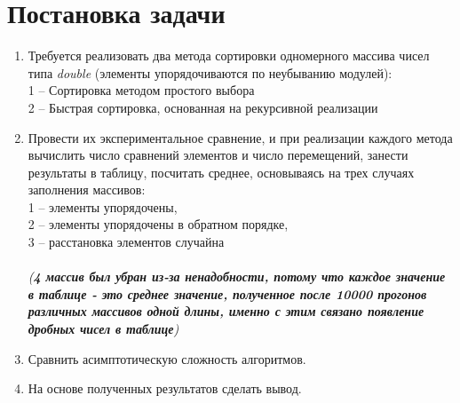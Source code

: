 \documentclass[a4paper,11pt]{article}
\begin{document}
    \newpage
    \section{Постановка задачи}
    \vspace{0,5cm}
    

    \begin{enumerate}
        \item Требуется реализовать два метода сортировки одномерного массива чисел типа \textit{double} (элементы упорядочиваются по неубыванию модулей):\\
        \hspace*{1 cm} 1 -- Сортировка методом простого выбора \\
        \hspace*{1 cm} 2 -- Быстрая сортировка, основанная на рекурсивной реализации
        \item Провести их экспериментальное сравнение, и при реализации каждого метода вычислить число сравнений элементов и число перемещений, занести результаты в таблицу, посчитать среднее, основываясь на трех случаях заполнения массивов:\\
        \hspace*{1.2 cm} 1 -- элементы упорядочены, \\ 
        \hspace*{1.2 cm} 2 -- элементы упорядочены в обратном порядке,\\ 
        \hspace*{1.2 cm} 3 -- расстановка элементов случайна\\
        \vspace{0 cm}\\
        \textit{(\textbf{4 массив был убран из-за ненадобности, потому что каждое значение в таблице - это среднее значение, полученное после 10000 прогонов различных массивов одной длины, именно с этим связано появление дробных чисел в таблице})}
        \item Сравнить асимптотическую сложность алгоритмов. 
        \item На основе полученных результатов сделать вывод.
    \end{enumerate}
\end{document}
